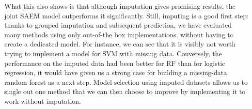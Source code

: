 What this also shows is that although imputation gives promising results, the joint SAEM model outperforms it significantly.
Still, imputing is a good first step: thanks to grouped imputation and subsequent prediction, we have evaluated many methods using only out-of-the box implementations, without having to create a dedicated model. For instance, we can see that it is visibly not worth trying to implement a model for SVM with missing data. Conversely, the performance on the imputed data had been better for RF than for logistic regression, it would have given us a strong case for building a missing-data random forest as a next step. Model selection using imputed datasets allows us to single out one method that we can then choose to improve by implementing it to work without imputation. 
